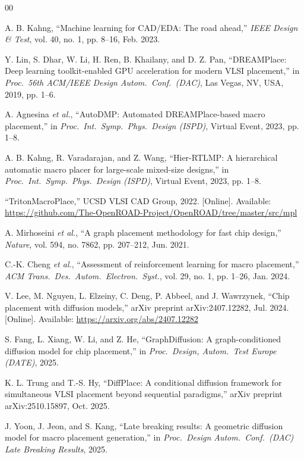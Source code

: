 \documentclass{ieeeaccess}
\begin{document}
\begin{thebibliography}{00}

 A. B. Kahng, ``Machine learning for CAD/EDA: The road ahead,'' \emph{IEEE Design \& Test}, vol. 40, no. 1, pp. 8--16, Feb. 2023.

 Y. Lin, S. Dhar, W. Li, H. Ren, B. Khailany, and D. Z. Pan, ``DREAMPlace: Deep learning toolkit-enabled GPU acceleration for modern VLSI placement,'' in \emph{Proc.\ 56th ACM/IEEE Design Autom.\ Conf.\ (DAC)}, Las Vegas, NV, USA, 2019, pp. 1--6.

 A. Agnesina \emph{et al.}, ``AutoDMP: Automated DREAMPlace-based macro placement,'' in \emph{Proc.\ Int.\ Symp.\ Phys.\ Design (ISPD)}, Virtual Event, 2023, pp. 1--8.

 A. B. Kahng, R. Varadarajan, and Z. Wang, ``Hier-RTLMP: A hierarchical automatic macro placer for large-scale mixed-size designs,'' in \emph{Proc.\ Int.\ Symp.\ Phys.\ Design (ISPD)}, Virtual Event, 2023, pp. 1--8.

 ``TritonMacroPlace,'' UCSD VLSI CAD Group, 2022. [Online]. Available: \underline{https://github.com/The-OpenROAD-Project/OpenROAD/tree/master/src/mpl}

 A. Mirhoseini \emph{et al.}, ``A graph placement methodology for fast chip design,'' \emph{Nature}, vol. 594, no. 7862, pp. 207--212, Jun. 2021.

 C.-K. Cheng \emph{et al.}, ``Assessment of reinforcement learning for macro placement,'' \emph{ACM Trans.\ Des.\ Autom.\ Electron.\ Syst.}, vol. 29, no. 1, pp. 1--26, Jan. 2024.

 V. Lee, M. Nguyen, L. Elzeiny, C. Deng, P. Abbeel, and J. Wawrzynek, ``Chip placement with diffusion models,'' arXiv preprint arXiv:2407.12282, Jul. 2024. [Online]. Available: \underline{https://arxiv.org/abs/2407.12282}

 S. Fang, L. Xiang, W. Li, and Z. He, ``GraphDiffusion: A graph-conditioned diffusion model for chip placement,'' in \emph{Proc.\ Design, Autom.\ Test Europe (DATE)}, 2025.

 K. L. Trung and T.-S. Hy, ``DiffPlace: A conditional diffusion framework for simultaneous VLSI placement beyond sequential paradigms,'' arXiv preprint arXiv:2510.15897, Oct. 2025.

 J. Yoon, J. Jeon, and S. Kang, ``Late breaking results: A geometric diffusion model for macro placement generation,'' in \emph{Proc.\ Design Autom.\ Conf.\ (DAC) Late Breaking Results}, 2025.


\end{thebibliography}
\end{document}

